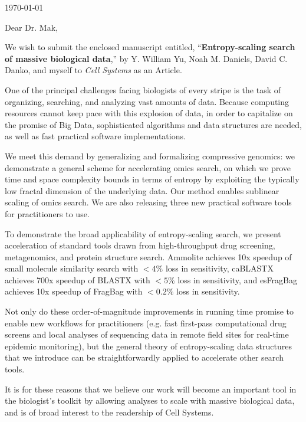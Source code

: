 \documentclass{article}
\begin{document}
\hspace*{0.5\linewidth}

\today

\bigskip

Dear Dr. Mak,

We wish to submit the enclosed manuscript entitled,
``\textbf{Entropy-scaling search of massive biological data},''
by Y. William Yu, Noah M. Daniels, David C. Danko, and myself
to \textit{Cell Systems} as an Article.

One of the principal challenges facing biologists of every stripe is the task 
of organizing, searching, and analyzing vast amounts of data.
Because computing resources cannot keep pace with this explosion of data, in order to capitalize on the promise of Big Data, sophisticated algorithms and data structures are needed, as well as fast practical software implementations.

We meet this demand by generalizing and formalizing compressive 
genomics: we demonstrate a general scheme for accelerating omics search, on which we prove time and space complexity bounds in terms 
of entropy by exploiting the typically low fractal dimension of the underlying 
data. 
Our method enables sublinear scaling of omics search.
We are also releasing three new practical software tools for practitioners to use.
 
To demonstrate the broad applicability of entropy-scaling search, we present acceleration of standard tools drawn from high-throughput drug screening, metagenomics, and protein structure search.
Ammolite achieves 10x speedup of small molecule similarity search with $<4\%$ loss in sensitivity,
caBLASTX achieves 700x speedup of BLASTX with $<5\%$ loss in sensitivity,  and esFragBag achieves 10x speedup of FragBag with $<0.2\%$ loss in sensitivity.

Not only do these order-of-magnitude improvements in running time promise to enable new workflows for practitioners (e.g. fast first-pass computational drug screens and local analyses of sequencing data in remote field sites for real-time epidemic 
monitoring), but the general theory of entropy-scaling data structures that we introduce can be straightforwardly applied to accelerate other search tools.

It is for these reasons that we believe our work will become an important tool in the biologist's toolkit by allowing analyses to scale with massive biological data, and is of broad interest to the readership of Cell Systems.
\end{document}
